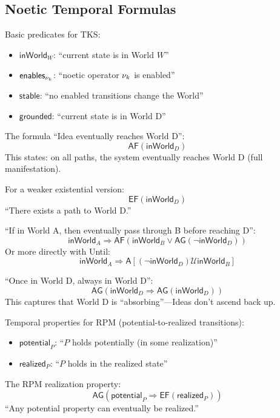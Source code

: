 \subsection{Noetic Temporal Formulas}
\label{subsec:noetic-temporal}

\begin{definition}
\label{def:world-predicates}
Basic predicates for TKS:
\begin{itemize}
  \item $\mathsf{inWorld}_W$: ``current state is in World $W$''
  \item $\mathsf{enables}_{\nu_{k}}$: ``noetic operator $\nu_{k}$ is enabled''
  \item $\mathsf{stable}$: ``no enabled transitions change the World''
  \item $\mathsf{grounded}$: ``current state is in World D''
\end{itemize}
\end{definition}

\begin{example}
\label{ex:eventually-grounded}
The formula ``Idea eventually reaches World D'':
\[
  \mathsf{AF}(\mathsf{inWorld}_D)
\]
This states: on all paths, the system eventually reaches World D (full manifestation).

For a weaker existential version:
\[
  \mathsf{EF}(\mathsf{inWorld}_D)
\]
``There exists a path to World D.''
\end{example}

\begin{example}
\label{ex:acbe-temporal}
``If in World A, then eventually pass through B before reaching D'':
\[
  \mathsf{inWorld}_A \Rightarrow \mathsf{AF}(\mathsf{inWorld}_B \lor \mathsf{AG}(\neg \mathsf{inWorld}_D))
\]
Or more directly with Until:
\[
  \mathsf{inWorld}_A \Rightarrow \mathsf{A}[(\neg \mathsf{inWorld}_D) \mathcal{U} \mathsf{inWorld}_B]
\]
\end{example}

\begin{example}
\label{ex:stability-temporal}
``Once in World D, always in World D'':
\[
  \mathsf{AG}(\mathsf{inWorld}_D \Rightarrow \mathsf{AG}(\mathsf{inWorld}_D))
\]
This captures that World D is ``absorbing''---Ideas don't ascend back up.
\end{example}

\begin{definition}
\label{def:rpm-temporal}
Temporal properties for RPM (potential-to-realized transitions):
\begin{itemize}
  \item $\mathsf{potential}_P$: ``$P$ holds potentially (in some realization)''
  \item $\mathsf{realized}_P$: ``$P$ holds in the realized state''
\end{itemize}

The RPM realization property:
\[
  \mathsf{AG}(\mathsf{potential}_P \Rightarrow \mathsf{EF}(\mathsf{realized}_P))
\]
``Any potential property can eventually be realized.''
\end{definition}

